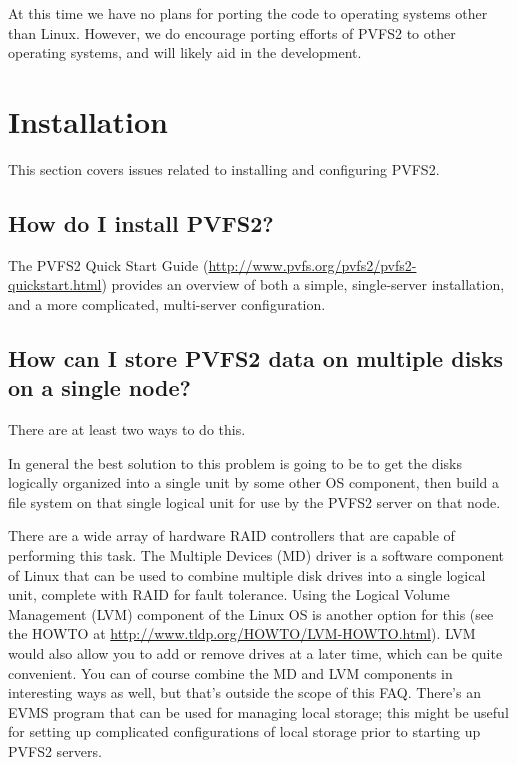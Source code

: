 \documentclass[11pt,letterpaper]{article}
\begin{document}
At this time we have no plans for porting the code to operating
systems other than Linux.  However, we do encourage porting efforts of
PVFS2 to other operating systems, and will likely aid in the
development.

%
%
\section{Installation}

This section covers issues related to installing and configuring PVFS2.

\subsection{How do I install PVFS2?}

The PVFS2 Quick Start Guide
(\url{http://www.pvfs.org/pvfs2/pvfs2-quickstart.html}) provides an overview
of both a simple, single-server installation, and a more complicated,
multi-server configuration.

\subsection{How can I store PVFS2 data on multiple disks on a single node?}
\label{sec:multiple-disks}

There are at least two ways to do this.

In general the best solution to this problem is going to be to get the disks
logically organized into a single unit by some other OS component, then build
a file system on that single logical unit for use by the PVFS2 server on that
node.

There are a wide array of hardware RAID controllers that are capable of
performing this task.
%
The Multiple Devices (MD) driver is a software component of Linux that can be
used to combine multiple disk drives into a single logical unit, complete with
RAID for fault tolerance.
%
Using the Logical Volume Management (LVM) component of the Linux OS is another
option for this (see the HOWTO at
\url{http://www.tldp.org/HOWTO/LVM-HOWTO.html}).  LVM would also allow you to
add or remove drives at a later time, which can be quite convenient.  You
can of course combine the MD and LVM components in interesting ways as well,
but that's outside the scope of this FAQ.
%
There's an EVMS program that can be used for managing local storage; this
might be useful for setting up complicated configurations of local storage
prior to starting up PVFS2 servers.
\end{document}
